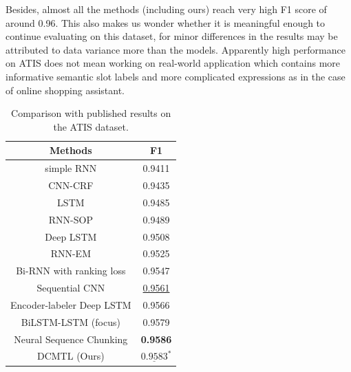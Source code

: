 Besides, almost all the methods (including ours) 
reach very high F1 score of around 0.96.
This also makes us wonder
whether it is meaningful enough to continue evaluating on this dataset,
for minor differences in the results may be attributed to data variance
more than the models.
Apparently high performance on ATIS does not 
mean working on real-world application
which contains more informative semantic slot labels and more complicated 
expressions as in the case of online shopping assistant.
\begin{table}[th]
	\centering
	\scriptsize
	\begin{tabular}{c|c}
		\toprule
		Methods & F1 \\
		\midrule
		simple RNN \cite{yao2013recurrent} & 0.9411 \\
		CNN-CRF \cite{xu2013convolutional} & 0.9435 \\
		LSTM \cite{yao2014spoken} & 0.9485 \\
		RNN-SOP \cite{liu2015recurrent} & 0.9489 \\
		Deep LSTM \cite{yao2014spoken} & 0.9508 \\
		RNN-EM \cite{peng2015recurrent} & 0.9525 \\
		Bi-RNN with ranking loss \cite{vu2016bi} & 0.9547 \\
		Sequential CNN  \cite{vu2016sequential} & \underline{0.9561} \\
		\midrule
		Encoder-labeler Deep LSTM \cite{kurata2016leveraging} & 0.9566 \\
		BiLSTM-LSTM (focus) \cite{zhu2017encoder} & 0.9579 \\
		Neural Sequence Chunking \cite{zhai2017neural} & \textbf{0.9586} \\
		\midrule
		DCMTL (Ours) & $\underline{0.9583}^{*}$  \\
		\bottomrule
	\end{tabular}
	\caption{Comparison with published results on the ATIS dataset.}
	\label{tab:eval_ATIS}
\end{table}

